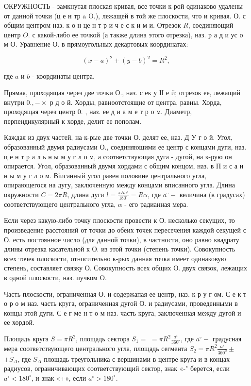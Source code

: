 \documentclass[10pt]{article}
\begin{document}
ОКРУЖНОСТЬ - замкнутая плоская кривая, все точки к-рой одинаково удалены от данной точки (ц е н тр a O.), лежащей в той же плоскости, что и кривая. О. с общим центром наз. к о н це н т р и ч е с к и м и. Отрезок $R$, соединяющий центр $O$. с какой-либо ее точкой (а также длина этого отрезка), наз. р а д и ус о м О. Уравнение О. в прямоугольных декартовых координатах:

\[
(x-a)^{2}+(y-b)^{2}=R^{2},
\]

где $a$ и $b$ - координаты центра.

Прямая, проходящая через две точки О., наз. с ек у ІІ е й; отрезок ее, лежащий внутри $0 .,-\times$ р д о й. Хорды, равноотстоящие от центра, равны. Хорда, проходящая через центр 0. , наз. ее д и а м е т р о м. Диаметр, перпендикулярный к хорде, делит ее пополам.

Каждая из двух частей, на к-рые две точки О. делят ее, наз. Д У г о й. Угол, образованный двумя радиусами О., соединяющими ее центр с концами дуги, наз. ц е н т р а л ь н ы м у г л о м, а соответствующая дуга - дугой, на к-рую он опирается. Угол, образованный двумя хордами с общим концом, наз. в П и с а н н ы м у г л о м. Віисанный угол равен половине центрального угла, опирающегося на дугу, заключенную между концами вписанного угла. Длина окружности $C=2 \pi R$, длина дуги $l=\frac{\pi R a^{\circ}}{180^{\circ}}=R \alpha$, где $a^{\circ}-$ величина (в градусах) соответствующего центрального угла, $\alpha$ - его радианная мера.

Если через какую-либо точку плоскости провести к О. несколько секущих, то произведение расстояний от точки до обеих точек пересечения каждой секущей с О. есть постоянное число (для данной точки), в частности, оно равно квадрату длины отрезка касательной к О. из этой точки (степень точки). Совокупность всех точек плоскости, относительно к-рых данная точка имеет одинаковую степень, составляет связку О. Совокупность всех общих О. двух связок, лежащих в одной плоскости, наз. пучком $\mathrm{O}$.

Часть плоскости, ограниченная О. и содержапая ее центр, наз. к р у г ом. С е к т о р о м наз. часть круга, ограниченная дугой О. и радиусами, проведенными в концы этой дуги. С е г ме н т о м наз. часть круга, заключенная между дугой и ее хордой.

Площадь круга $S=\pi R^{2}$, площадь сектора $S_{1}=$ $=\pi R^{2} \frac{a^{\circ}}{360^{\circ}}$, где $a^{\circ}-$ градусная мера соответствующего центрального угла, площадь сегмента $S_{2}=\pi R^{2} \frac{a^{\circ}}{360^{0}} \pm$ $\pm S_{\Delta}$, где $S_{\Delta}$-площадь треугольника с вершинами в центре круга и в концах радиусов, ограничивающих соответствующий сектор, знак «-" берется, если $a^{\circ}<180^{\circ}$, и знак «+», если $a^{\circ}>180^{\circ}$.
\end{document}
